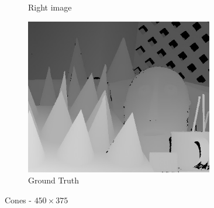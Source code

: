 \begin{figure}[ht]
\begin{subfigure}[t]{0.3\textwidth}
    \caption{Right image\label{fig:apcon_r}}
  \end{subfigure}\hspace{0.5cm}
  \begin{subfigure}[t]{0.3\textwidth}
    \centering\includegraphics[width=0.9\textwidth]{figures/con_gt}
    \caption{Ground Truth\label{fig:apcon_gt}}
  \end{subfigure}
  \caption{Cones - $450\times375$ \cite{Scharstein2003}\label{fig:apcon}}
\end{figure}

